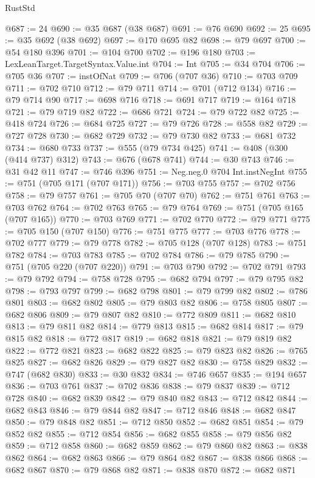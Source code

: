 \begin{lexlean}{RustStd}
\begin{coremodule}
@687 := 24
@690 := @35 @687 (@38 @687)
@691 := @76 @690
@692 := 25
@695 := @35 @692 (@38 @692)
@697 := @170 @695 @82
@698 := @79 @697
@700 := @54 @180 @396
@701 := @104 @700
@702 := @196 @180
@703 := LexLeanTarget.TargetSyntax.Value.int
@704 := Int
@705 := @34 @704
@706 := @705 @36
@707 := instOfNat
@709 := @706 (@707 @36)
@710 := @703 @709
@711 := @702 @710
@712 := @79 @711
@714 := @701 (@712 @134)
@716 := @79 @714 @90
@717 := @698 @716
@718 := @691 @717
@719 := @164 @718
@721 := @79 @719 @82
@722 := @686 @721
@724 := @79 @722 @82
@725 := @418 @724
@726 := @684 @725
@727 := @79 @726
@728 := @558 @82
@729 := @727 @728
@730 := @682 @729
@732 := @79 @730 @82
@733 := @681 @732
@734 := @680 @733
@737 := @555 (@79 @734 @425)
@741 := @408 (@300 (@414 @737) @312)
@743 := @676 (@678 @741)
@744 := @30 @743
@746 := @31 @42 @11
@747 := @746 @396
@751 := Neg.neg.{0} @704 Int.instNegInt
@755 := @751 (@705 @171 (@707 @171))
@756 := @703 @755
@757 := @702 @756
@758 := @79 @757
@761 := @705 @70 (@707 @70)
@762 := @751 @761
@763 := @703 @762
@764 := @702 @763
@765 := @79 @764
@769 := @751 (@705 @165 (@707 @165))
@770 := @703 @769
@771 := @702 @770
@772 := @79 @771
@775 := @705 @150 (@707 @150)
@776 := @751 @775
@777 := @703 @776
@778 := @702 @777
@779 := @79 @778
@782 := @705 @128 (@707 @128)
@783 := @751 @782
@784 := @703 @783
@785 := @702 @784
@786 := @79 @785
@790 := @751 (@705 @220 (@707 @220))
@791 := @703 @790
@792 := @702 @791
@793 := @79 @792
@794 := @758 @728
@795 := @682 @794
@797 := @79 @795 @82
@798 := @793 @797
@799 := @682 @798
@801 := @79 @799 @82
@802 := @786 @801
@803 := @682 @802
@805 := @79 @803 @82
@806 := @758 @805
@807 := @682 @806
@809 := @79 @807 @82
@810 := @772 @809
@811 := @682 @810
@813 := @79 @811 @82
@814 := @779 @813
@815 := @682 @814
@817 := @79 @815 @82
@818 := @772 @817
@819 := @682 @818
@821 := @79 @819 @82
@822 := @772 @821
@823 := @682 @822
@825 := @79 @823 @82
@826 := @765 @825
@827 := @682 @826
@829 := @79 @827 @82
@830 := @758 @829
@832 := @747 (@682 @830)
@833 := @30 @832
@834 := @746 @657
@835 := @194 @657
@836 := @703 @761
@837 := @702 @836
@838 := @79 @837
@839 := @712 @728
@840 := @682 @839
@842 := @79 @840 @82
@843 := @712 @842
@844 := @682 @843
@846 := @79 @844 @82
@847 := @712 @846
@848 := @682 @847
@850 := @79 @848 @82
@851 := @712 @850
@852 := @682 @851
@854 := @79 @852 @82
@855 := @712 @854
@856 := @682 @855
@858 := @79 @856 @82
@859 := @712 @858
@860 := @682 @859
@862 := @79 @860 @82
@863 := @838 @862
@864 := @682 @863
@866 := @79 @864 @82
@867 := @838 @866
@868 := @682 @867
@870 := @79 @868 @82
@871 := @838 @870
@872 := @682 @871

\end{coremodule}
\end{lexlean}
